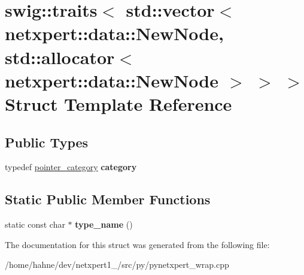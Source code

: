 \hypertarget{structswig_1_1traits_3_01std_1_1vector_3_01netxpert_1_1data_1_1NewNode_00_01std_1_1allocator_3_022e59c519961a405c4276e987e728848}{}\section{swig\+:\+:traits$<$ std\+:\+:vector$<$ netxpert\+:\+:data\+:\+:New\+Node, std\+:\+:allocator$<$ netxpert\+:\+:data\+:\+:New\+Node $>$ $>$ $>$ Struct Template Reference}
\label{structswig_1_1traits_3_01std_1_1vector_3_01netxpert_1_1data_1_1NewNode_00_01std_1_1allocator_3_022e59c519961a405c4276e987e728848}
\subsection*{Public Types}
\begin{DoxyCompactItemize}
\item 
typedef \hyperlink{structswig_1_1pointer__category}{pointer\+\_\+category} {\bfseries category}\hypertarget{structswig_1_1traits_3_01std_1_1vector_3_01netxpert_1_1data_1_1NewNode_00_01std_1_1allocator_3_022e59c519961a405c4276e987e728848_a88a26d03340c2c10d77bcf078f68c013}{}\label{structswig_1_1traits_3_01std_1_1vector_3_01netxpert_1_1data_1_1NewNode_00_01std_1_1allocator_3_022e59c519961a405c4276e987e728848_a88a26d03340c2c10d77bcf078f68c013}

\end{DoxyCompactItemize}
\subsection*{Static Public Member Functions}
\begin{DoxyCompactItemize}
\item 
static const char $\ast$ {\bfseries type\+\_\+name} ()\hypertarget{structswig_1_1traits_3_01std_1_1vector_3_01netxpert_1_1data_1_1NewNode_00_01std_1_1allocator_3_022e59c519961a405c4276e987e728848_a641efc08c2c27c00ae969798753c9afb}{}\label{structswig_1_1traits_3_01std_1_1vector_3_01netxpert_1_1data_1_1NewNode_00_01std_1_1allocator_3_022e59c519961a405c4276e987e728848_a641efc08c2c27c00ae969798753c9afb}

\end{DoxyCompactItemize}


The documentation for this struct was generated from the following file\+:\begin{DoxyCompactItemize}
\item 
/home/hahne/dev/netxpert1\+\_/src/py/pynetxpert\+\_\+wrap.\+cpp\end{DoxyCompactItemize}
